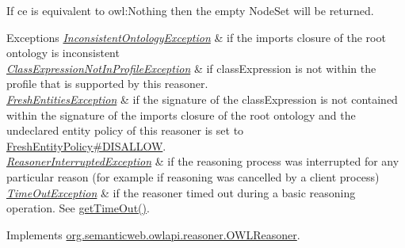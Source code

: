 If {\ttfamily ce} is equivalent to {\ttfamily owl\-:Nothing} then the empty {\ttfamily Node\-Set} will be returned.


\begin{DoxyExceptions}{Exceptions}
{\em \hyperlink{classorg_1_1semanticweb_1_1owlapi_1_1reasoner_1_1_inconsistent_ontology_exception}{Inconsistent\-Ontology\-Exception}} & if the imports closure of the root ontology is inconsistent \\
\hline
{\em \hyperlink{classorg_1_1semanticweb_1_1owlapi_1_1reasoner_1_1_class_expression_not_in_profile_exception}{Class\-Expression\-Not\-In\-Profile\-Exception}} & if {\ttfamily class\-Expression} is not within the profile that is supported by this reasoner. \\
\hline
{\em \hyperlink{classorg_1_1semanticweb_1_1owlapi_1_1reasoner_1_1_fresh_entities_exception}{Fresh\-Entities\-Exception}} & if the signature of the class\-Expression is not contained within the signature of the imports closure of the root ontology and the undeclared entity policy of this reasoner is set to \hyperlink{enumorg_1_1semanticweb_1_1owlapi_1_1reasoner_1_1_fresh_entity_policy_a762eae6d5b2449d125311ecaabfdc8d0}{Fresh\-Entity\-Policy\#\-D\-I\-S\-A\-L\-L\-O\-W}. \\
\hline
{\em \hyperlink{classorg_1_1semanticweb_1_1owlapi_1_1reasoner_1_1_reasoner_interrupted_exception}{Reasoner\-Interrupted\-Exception}} & if the reasoning process was interrupted for any particular reason (for example if reasoning was cancelled by a client process) \\
\hline
{\em \hyperlink{classorg_1_1semanticweb_1_1owlapi_1_1reasoner_1_1_time_out_exception}{Time\-Out\-Exception}} & if the reasoner timed out during a basic reasoning operation. See \hyperlink{classorg_1_1semanticweb_1_1owlapi_1_1reasoner_1_1impl_1_1_o_w_l_reasoner_base_af55342eaaabb1b72dacfde7a181b93d2}{get\-Time\-Out()}. \\
\hline
\end{DoxyExceptions}


Implements \hyperlink{interfaceorg_1_1semanticweb_1_1owlapi_1_1reasoner_1_1_o_w_l_reasoner_a30bc6e45c539a716c9bf2c702b622edc}{org.\-semanticweb.\-owlapi.\-reasoner.\-O\-W\-L\-Reasoner}.


